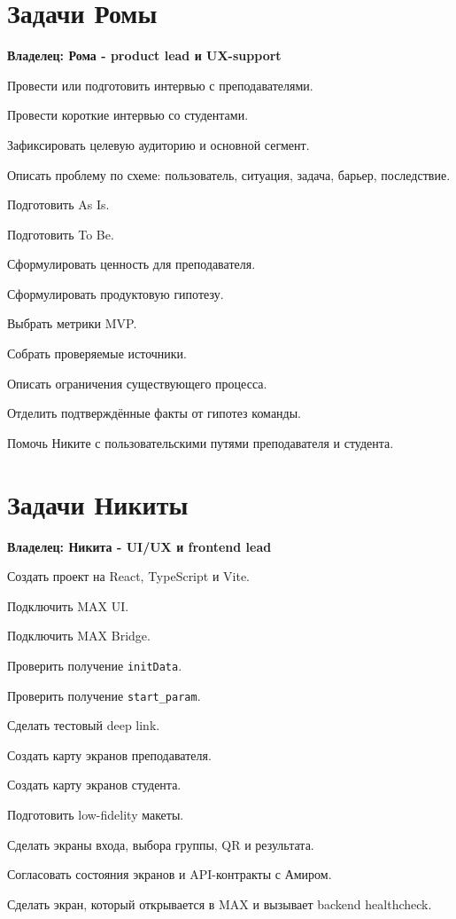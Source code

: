 \documentclass[11pt,a4paper]{article}
\newcommand{\code}[1]{\texttt{#1}}
\newcommand{\owner}[1]{\textcolor{MaxPurple}{\textbf{Владелец: #1}}}
\begin{document}
\section{Задачи Ромы}
\owner{Рома - product lead и UX-support}
\begin{tasklist}
  \item Провести или подготовить интервью с преподавателями.
  \item Провести короткие интервью со студентами.
  \item Зафиксировать целевую аудиторию и основной сегмент.
  \item Описать проблему по схеме: пользователь, ситуация, задача, барьер, последствие.
  \item Подготовить As Is.
  \item Подготовить To Be.
  \item Сформулировать ценность для преподавателя.
  \item Сформулировать продуктовую гипотезу.
  \item Выбрать метрики MVP.
  \item Собрать проверяемые источники.
  \item Описать ограничения существующего процесса.
  \item Отделить подтверждённые факты от гипотез команды.
  \item Помочь Никите с пользовательскими путями преподавателя и студента.
\end{tasklist}

\section{Задачи Никиты}
\owner{Никита - UI/UX и frontend lead}
\begin{tasklist}
  \item Создать проект на React, TypeScript и Vite.
  \item Подключить MAX UI.
  \item Подключить MAX Bridge.
  \item Проверить получение \code{initData}.
  \item Проверить получение \code{start\_param}.
  \item Сделать тестовый deep link.
  \item Создать карту экранов преподавателя.
  \item Создать карту экранов студента.
  \item Подготовить low-fidelity макеты.
  \item Сделать экраны входа, выбора группы, QR и результата.
  \item Согласовать состояния экранов и API-контракты с Амиром.
  \item Сделать экран, который открывается в MAX и вызывает backend healthcheck.
\end{tasklist}
\end{document}
